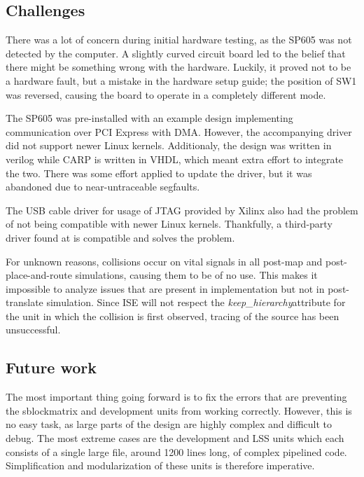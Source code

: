 
\subsection{Challenges}
\label{sec:challenges}

There was a lot of concern during initial hardware testing, as the SP605 was not detected by the computer.
A slightly curved circuit board led to the belief that there might be something wrong with the hardware.
Luckily, it proved not to be a hardware fault, but a mistake in the hardware setup guide; the position of SW1 was reversed, causing the board to operate in a completely different mode.

The SP605 was pre-installed with an example design implementing communication over PCI Express with DMA.
However, the accompanying driver did not support newer Linux kernels.
Additionaly, the design was written in verilog while CARP is written in VHDL, which meant extra effort to integrate the two.
There was some effort applied to update the driver, but it was abandoned due to near-untraceable segfaults.

The USB cable driver for usage of JTAG provided by Xilinx also had the problem of not being compatible with newer Linux kernels.
Thankfully, a third-party driver found at \cite{usbdriver} is compatible and solves the problem.

For unknown reasons, collisions occur on vital signals in all post-map and post-place-and-route simulations\footnotemark, causing them to be of no use.
This makes it impossible to analyze issues that are present in implementation but not in post-translate simulation.
Since ISE will not respect the \emph{keep\_hierarchy}\footnotemark attribute for the unit in which the collision is first observed, tracing of the source has been unsuccessful.

\subsection{Future work}

The most important thing going forward is to fix the errors that are preventing the sblockmatrix and development units from working correctly.
However, this is no easy task, as large parts of the design are highly complex and difficult to debug.
The most extreme cases are the development and LSS units which each consists of a single large file, around 1200 lines long, of complex pipelined code.
Simplification and modularization of these units is therefore imperative.

